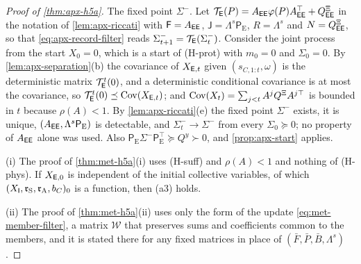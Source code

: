 \begin{proof}[Proof of \cref{thm:apx-h5a}]
The fixed point $\Sigma^-$. Let $\mathcal T_{\mathsf{E}}(P)=A_{\mathsf{E}\mathsf{E}}\varphi(P)A_{\mathsf{E}\mathsf{E}}^\top+Q^{\Xi}_{\mathsf{E}\mathsf{E}}$ in the notation of \cref{lem:apx-riccati} with $\mathsf F=A_{\mathsf{E}\mathsf{E}}$, $\mathsf J=\Lambda^s\mathsf P_{\mathrm E}$, $R=\Lambda^s$ and $N=Q^{\Xi}_{\mathsf{E}\mathsf{E}}$, so that \eqref{eq:apx-record-filter} reads $\Sigma^-_{t+1}=\mathcal T_{\mathsf{E}}(\Sigma^-_t)$. Consider the joint process from the start $X_0=0$, which is a start of (H-prot) with $m_0=0$ and $\Sigma_0=0$. By \cref{lem:apx-separation}(b) the covariance of $X_{\mathsf{E},t}$ given $(s_{C,1:t},\omega)$ is the deterministic matrix $\mathcal T_{\mathsf{E}}^t(0)$, and a deterministic conditional covariance is at most the covariance, so $\mathcal T_{\mathsf{E}}^t(0)\preceq\operatorname{Cov}(X_{\mathsf{E},t})$; and $\operatorname{Cov}(X_t)=\sum_{j<t}A^jQ^{\Xi}A^{j\top}$ is bounded in $t$ because $\rho(A)<1$. By \cref{lem:apx-riccati}(e) the fixed point $\Sigma^-$ exists, it is unique, $(A_{\mathsf{E}\mathsf{E}},\Lambda^s\mathsf P_{\mathrm E})$ is detectable, and $\Sigma^-_t\to\Sigma^-$ from every $\Sigma_0\succeq0$; no property of $A_{\mathsf{E}\mathsf{E}}$ alone was used. Also $\mathsf P_{\mathrm E}\Sigma^-\mathsf P_{\mathrm E}^\top\succeq Q^y\succ0$, and \cref{prop:apx-start} applies.

(i) The proof of \cref{thm:met-h5a}(i) uses (H-suff) and $\rho(A)<1$ and nothing of (H-phys). If $X_{\mathsf{E},0}$ is independent of the initial collective variables, of which $(X_{\mathsf{I}},\mathfrak r_{\mathrm S},\mathfrak r_{\mathrm A},b_C)_0$ is a function, then (a3) holds.

(ii) The proof of \cref{thm:met-h5a}(ii) uses only the form of the update \eqref{eq:met-member-filter}, a matrix $\mathcal W$ that preserves sums and coefficients common to the members, and it is stated there for any fixed matrices in place of $(\bar F,\bar P,\bar B,\Lambda^s)$.


\end{proof}
